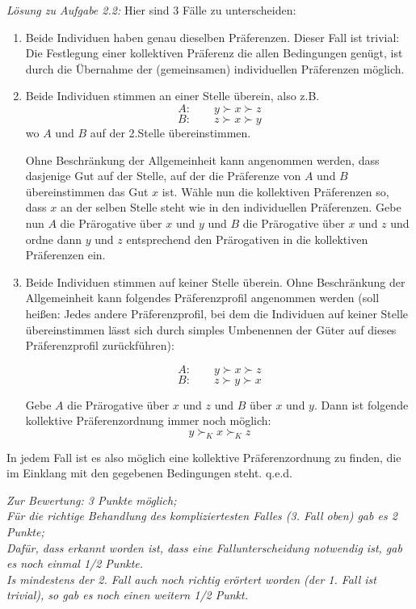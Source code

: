 \documentclass[10pt, a4paper, german]{article}
\numberwithin {equation}{section}
\begin{document}
{\em Lösung zu Aufgabe 2.2:} Hier sind 3 Fälle zu unterscheiden:
\begin{enumerate}
  \item Beide Individuen haben genau dieselben Präferenzen. Dieser Fall
  ist trivial: Die Festlegung einer kollektiven Präferenz die allen
  Bedingungen genügt, ist durch die Übernahme der (gemeinsamen)
  individuellen Präferenzen möglich.

  \item Beide Individuen stimmen an einer Stelle überein, also z.B.
\[A:\qquad y \succ x \succ z \]
\[B:\qquad z \succ x \succ y \]
  wo $A$ und $B$ auf der 2.Stelle übereinstimmen.

  Ohne Beschränkung der Allgemeinheit kann angenommen werden, dass dasjenige Gut
  auf der Stelle, auf der die Präferenze von $A$ und $B$ übereinstimmen das Gut
  $x$ ist. Wähle nun die kollektiven Präferenzen so, dass $x$ an der selben
  Stelle steht wie in den individuellen Präferenzen. Gebe nun $A$ die
  Prärogative über $x$ und $y$ und $B$ die Prärogative über $x$ und $z$ und
  ordne dann $y$ und $z$ entsprechend den Prärogativen in die kollektiven
  Präferenzen ein.

  \item Beide Individuen stimmen auf keiner Stelle überein. Ohne Beschränkung
  der Allgemeinheit kann folgendes Präferenzprofil angenommen werden (soll
  heißen: Jedes andere Präferenzprofil, bei dem die Individuen auf keiner
  Stelle übereinstimmen lässt sich durch simples Umbenennen der Güter auf
  dieses Präferenzprofil zurückführen):

\[A:\qquad y \succ x \succ z \]
\[B:\qquad z \succ y \succ x \]

  Gebe $A$ die Prärogative über $x$ und $z$ und $B$ über $x$ und $y$. Dann ist
  folgende kollektive Präferenzordnung immer noch möglich:
\[ y \succ_K x \succ_K z \]
\end{enumerate}
In jedem Fall ist es also möglich eine kollektive Präferenzordnung zu finden,
die im Einklang mit den gegebenen Bedingungen steht. q.e.d.

\vspace{0.25cm}

{\em Zur Bewertung: 3 Punkte möglich; \\
Für die richtige Behandlung des kompliziertesten Falles (3. Fall oben) gab es 2
Punkte; \\
Dafür, dass erkannt worden ist, dass eine Fallunterscheidung notwendig ist, gab
es noch einmal 1/2 Punkte.\\
Is mindestens der 2. Fall auch noch richtig erörtert worden (der 1. Fall ist
trivial), so gab es noch einen weitern 1/2 Punkt.}
\end{document}
